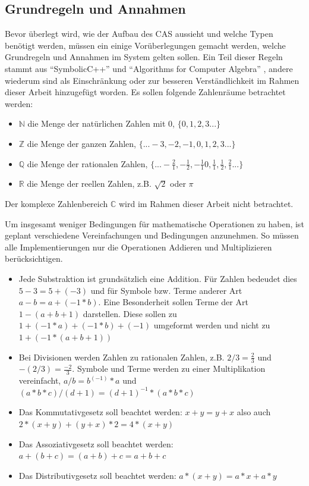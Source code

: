 \documentclass[11pt,a4paper, ngerman]{article}
\begin{document}
\subsection{Grundregeln und Annahmen}
Bevor überlegt wird, wie der Aufbau des CAS aussieht und welche Typen benötigt werden, müssen ein einige Vorüberlegungen gemacht werden, welche Grundregeln und Annahmen im System gelten sollen. Ein Teil dieser Regeln stammt aus ``SymbolicC++'' \cite[S. 2]{Tan2000} und ``Algorithms for Computer Algebra'' \cite[S. 23 ff.]{Geddes2007}, andere wiederum sind als Einschränkung oder zur besseren Verständlichkeit im Rahmen dieser Arbeit hinzugefügt worden. Es sollen folgende Zahlenräume betrachtet werden:
\begin{itemize}
    \item $\mathbb{N}$ die Menge der natürlichen Zahlen mit 0, $\{0, 1, 2, 3...\}$
    \item $\mathbb{Z}$ die Menge der ganzen Zahlen, $\{...-3, -2, -1, 0, 1, 2, 3...\}$
    \item $\mathbb{Q}$ die Menge der rationalen Zahlen, $\{...-\frac{2}{1}, -\frac{1}{2}, -\frac{1}{1} 0, \frac{1}{1}, \frac{1}{2}, \frac{2}{1}...\}$
    \item $\mathbb{R}$ die Menge der reellen Zahlen, z.B. $\sqrt{2}$ oder $\pi$
\end{itemize}

Der komplexe Zahlenbereich  $\mathbb{C}$ wird im Rahmen dieser Arbeit nicht betrachtet.

Um insgesamt weniger Bedingungen für mathematische Operationen zu haben, ist geplant verschiedene Vereinfachungen und Bedingungen anzunehmen. So müssen alle Implementierungen nur die Operationen Addieren und Multiplizieren berücksichtigen.
\begin{itemize}
    \item Jede Substraktion ist grundsätzlich eine Addition. Für Zahlen bedeudet dies $5-3 = 5+(-3)$ und für Symbole bzw. Terme anderer Art $a-b = a+(-1 * b)$. Eine Besonderheit sollen Terme der Art $1-(a+b+1)$ darstellen. Diese sollen zu $1+(-1*a)+(-1*b)+(-1)$ umgeformt werden und nicht zu $1+(-1*(a+b+1))$
    \item Bei Divisionen werden Zahlen zu rationalen Zahlen, z.B. $2/3 = \frac{2}{3}$ und $-(2/3) = \frac{-2}{3}$. Symbole und Terme werden zu einer Multiplikation vereinfacht, $a/b = b^{(-1)} * a$ und $(a*b*c)/(d+1) = (d+1)^{-1} * (a*b*c)$
    \item Das Kommutativgesetz soll beachtet werden: $x+y = y+x$ also auch $2*(x+y) + (y+x)*2 = 4*(x+y)$
    \item Das Assoziativgesetz soll beachtet werden: $a+(b+c) = (a+b)+c = a+b+c$
    \item Das Distributivgesetz soll beachtet werden: $a*(x+y) = a*x + a*y$
\end{itemize}
\end{document}
